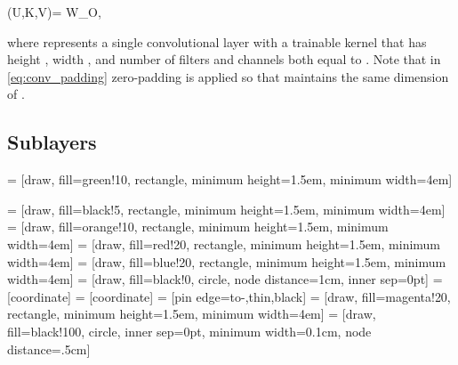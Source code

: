 \documentclass[conference, letterpaper, 10pt]{IEEEtran}
\begin{document}
    (U,K,V)= W_O,

where  represents a single convolutional layer with a trainable kernel  that has height , width , and number of filters and channels both equal to .
Note that in \eqref{eq:conv_padding} zero-padding is applied so that  maintains the same dimension of .

\subsection{Sublayers}
\begin{figure*}[h!]
\centering
\clearpage{} = [draw, fill=green!10, rectangle, 
    minimum height=1.5em, minimum width=4em]
    
 = [draw, fill=black!5, rectangle, 
    minimum height=1.5em, minimum width=4em]
 = [draw, fill=orange!10, rectangle, 
    minimum height=1.5em, minimum width=4em]
 = [draw, fill=red!20, rectangle, 
    minimum height=1.5em, minimum width=4em]
 = [draw, fill=blue!20, rectangle, 
    minimum height=1.5em, minimum width=4em]
 = [draw, fill=black!0, circle, node distance=1cm, inner sep=0pt]
 = [coordinate]
 = [coordinate]
 = [pin edge={to-,thin,black}]
 = [draw, fill=magenta!20, rectangle, 
    minimum height=1.5em, minimum width=4em]
 = [draw, fill=black!100, circle, inner sep=0pt, minimum width=0.1cm, node distance=.5cm]
\def\rightdist{1.2cm}
\def\vertdist{.5cm}
\def\vertdistplus{.6cm}
\def\FABIRrightdist{2.0cm}
\end{figure*}
\end{document}

